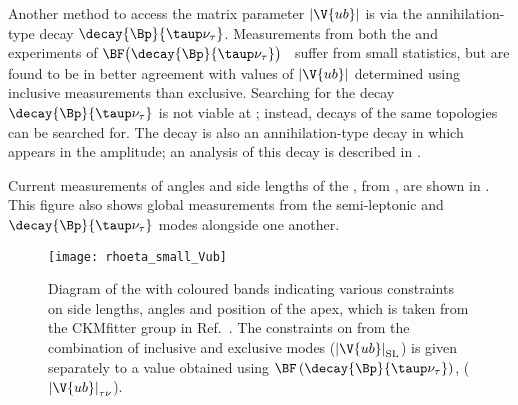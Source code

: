 
Another method to access the \ckm matrix parameter $\left|\V{ub}\right|$ is via the
annihilation-type decay $\decay{\Bp}{\taup\nu_\tau}$.
Measurements from both the \babar and \belle experiments of
$\BF\big(\decay{\Bp}{\taup\nu_\tau}\big)$~\cite{Lees:2012ju,Abdesselam:2014hkd} suffer from small
statistics, but are found to be in better agreement with values of $\left|\V{ub}\right|$
determined using inclusive measurements than exclusive.
Searching for the decay $\decay{\Bp}{\taup\nu_\tau}$ is not viable at \lhcb; instead, decays of the
same topologies can be searched for.
The decay \btodsphi is also an annihilation-type decay in which  appears in the amplitude;
an analysis of this decay is described in .

Current measurements of angles and side lengths of the \ut, from , are shown
in .
This figure also shows
global  measurements from the semi-leptonic and $\decay{\Bp}{\taup\nu_\tau}$
modes alongside one another.


\begin{figure}
  \begin{center}
      \texttt{[image: rhoeta\_small\_Vub]}
  \end{center}
  \caption[Unitarity triangle and current constraints]
  {
    Diagram of the \ut with coloured bands indicating various constraints on
    side lengths, angles and position of the apex, which is taken from the CKMfitter group in
    Ref.~\protect\cite{Charles:2015gya}.
    The constraints on  from the combination of inclusive and exclusive modes
    ($\left|\V{ub}\right|_\mathrm{SL}$) is given separately to a value obtained using
    $\BF\left(\decay{\Bp}{\taup\nu_\tau}\right)$, ($\left|\V{ub}\right|_{\tau\nu}$).
  }
  \label{fig:th:ckmfitter}
\end{figure}


